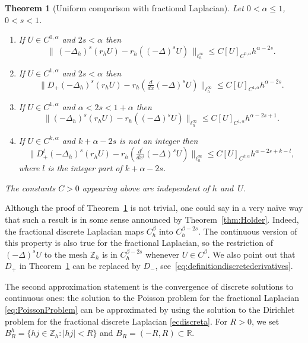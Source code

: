 \documentclass[a4paper,11pt,reqno]{amsart}
\newcommand{\R}{\mathbb{R}}
\newcommand{\Z}{\mathbb{Z}}
\newtheorem{thm}{Theorem}[section]
\theoremstyle{definition}
\numberwithin{equation}{section}
\begin{document}
\begin{thm}[Uniform comparison with fractional Laplacian]
\label{thm:consistencia1d}
Let $0<\alpha\le 1$, $0<s<1$.
\begin{enumerate}[$(i)$]
\item \label{(iCon)} If $U\in C^{0,\alpha}$ and $2s<\alpha$ then
\[
\|\, (-\Delta_h)^s(r_hU)-r_h((-\Delta)^sU)\, \|_{\ell_h^\infty}\leq C[U]_{C^{0,\alpha}}h^{\alpha-2s}.
\]
\item \label{(iiCon)} If $U\in C^{1,\alpha}$ and $2s<\alpha$ then
\[
\|D_+(-\Delta_h)^s(r_hU)-r_h(\tfrac{d}{dx}(-\Delta)^sU)\|_{\ell_h^\infty}\leq C[U]_{C^{1,\alpha}}h^{\alpha-2s}.
\]
\item \label{(iiiCon)} If $U\in C^{1,\alpha}$ and $\alpha<2s<1+\alpha$ then
\[
\|(-\Delta_h)^s(r_hU)-r_h((-\Delta)^sU)\|_{\ell_h^\infty}\leq C[U]_{C^{1,\alpha}}h^{\alpha-2s+1}.
\]
\item \label{(ivCon)} If $U\in C^{k,\alpha}$ and $k+\alpha-2s$
is not an integer then
\[
\|D_+^l(-\Delta_h)^s(r_hU)-r_h(\tfrac{d^{l}}{dx^{l}}(-\Delta)^sU)\|_{\ell_h^\infty}
\leq C[U]_{C^{k,\alpha}}h^{\alpha-2s+k-l},
\]
where $l$ is the integer part of $k+\alpha-2s$.
\end{enumerate}
The constants $C>0$ appearing above are independent of $h$ and~$U$.
\end{thm}

Although the proof of Theorem~\ref{thm:consistencia1d} is not trivial,
one could say in a very na\"ive way that such a result
is in some sense announced by Theorem~\ref{thm:Holder}. Indeed,
the fractional discrete Laplacian maps $C^{\beta}_h$ into $C^{\beta-2s}_h$. The continuous version
of this property is also true for the fractional Laplacian, so the restriction of $(-\Delta)^sU$
to the mesh $\Z_h$ is in $C^{\beta-2s}_h$
whenever $U\in C^{\beta}$.
We also point out that $D_+$ in Theorem~\ref{thm:consistencia1d}
can be replaced by $D_-$, see~\eqref{eq:definitiondiscretederivatives}.

The second approximation statement
is the convergence of discrete solutions to continuous ones:
the solution to the Poisson problem for the fractional Laplacian
\eqref{eq:PoissonProblem} can be approximated by using the solution
to the Dirichlet problem for the fractional discrete Laplacian \eqref{ecdiscreta}.
For $R>0$, we set $B_R^h=\{hj\in \Z_h: |hj|<R\}$
and $B_R=(-R,R)\subset\R$.
\end{document}
